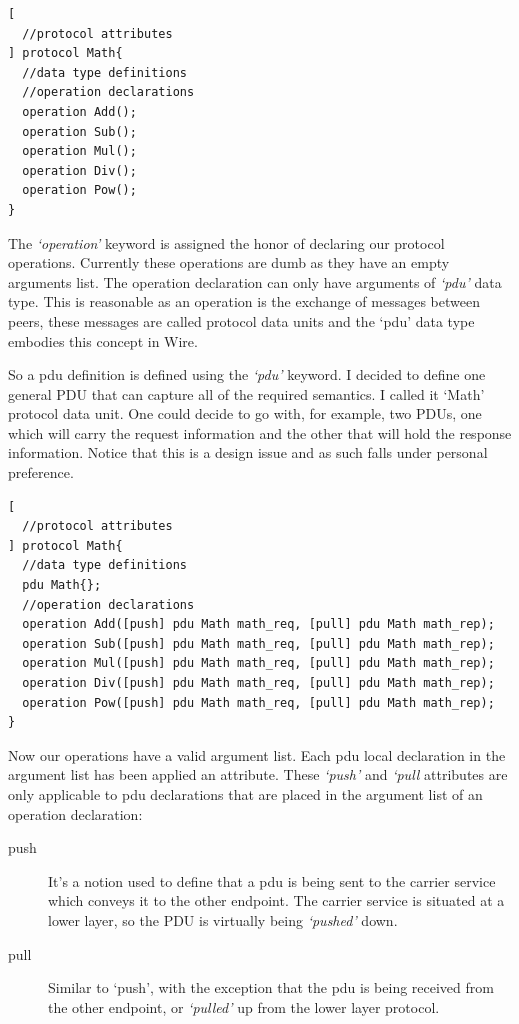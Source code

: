 \documentclass[times, utf8, diplomski]{fer}
\begin{document}
\lstset{language=IDL}
\lstset{basicstyle=\tiny}
\lstset{numbers=left, numberstyle=\tiny, stepnumber=1, numbersep=5pt}
\begin{lstlisting}[frame=tb]
[
  //protocol attributes
] protocol Math{
  //data type definitions
  //operation declarations
  operation Add();
  operation Sub();
  operation Mul();
  operation Div();
  operation Pow();
}
\end{lstlisting}

The \emph{`operation'} keyword is assigned the honor of declaring our protocol 
operations. Currently these operations are dumb as they have an empty arguments 
list. The operation declaration can only have arguments of \emph{`pdu'} data type.
This is reasonable as an operation is the exchange of messages between peers, 
these messages are called protocol data units and the `pdu' data type embodies 
this concept in Wire.

So a pdu definition is defined using the \emph{`pdu'} keyword. I decided to 
define one general PDU that can capture all of the required semantics. I called 
it `Math' protocol data unit. One could decide to go with, for example, two PDUs, 
one which will carry the request information and the other that will hold the 
response information. Notice that this is a design issue and as such falls under 
personal preference.

\lstset{language=IDL}
\lstset{basicstyle=\tiny}
\lstset{numbers=left, numberstyle=\tiny, stepnumber=1, numbersep=5pt}
\begin{lstlisting}[frame=tb]
[
  //protocol attributes
] protocol Math{
  //data type definitions
  pdu Math{};
  //operation declarations
  operation Add([push] pdu Math math_req, [pull] pdu Math math_rep);
  operation Sub([push] pdu Math math_req, [pull] pdu Math math_rep);
  operation Mul([push] pdu Math math_req, [pull] pdu Math math_rep);
  operation Div([push] pdu Math math_req, [pull] pdu Math math_rep);
  operation Pow([push] pdu Math math_req, [pull] pdu Math math_rep);
}
\end{lstlisting}

Now our operations have a valid argument list. Each pdu local declaration in the 
argument list has been applied an attribute. These \emph{`push'} and \emph{`pull}
attributes are only applicable to pdu declarations that are placed in the argument 
list of an operation declaration:
\begin{description}
	\item[push] It's a notion used to define that a pdu is being sent to the 
		carrier service which conveys it to the other endpoint. The carrier 
		service is situated at a lower layer, so the PDU is virtually being 
		\emph{`pushed'} down.
	\item[pull] Similar to `push', with the exception that the pdu is being 
		received from the other endpoint, or \emph{`pulled'} up from the lower 
		layer protocol.
\end{description}
\end{document}
